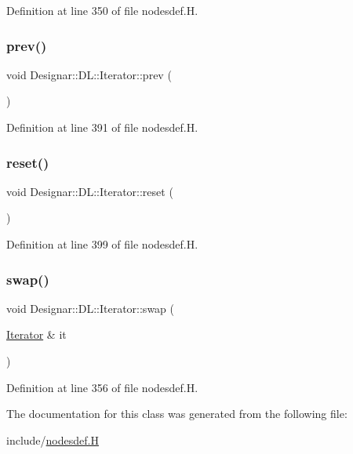 Definition at line 350 of file nodesdef.\+H.

\mbox{\label{class_designar_1_1_d_l_1_1_iterator_a8550a08d7c7645c8ec41ba209ee21893}} 
\subsubsection{\texorpdfstring{prev()}{prev()}}
{\footnotesize\ttfamily void Designar\+::\+D\+L\+::\+Iterator\+::prev (\begin{DoxyParamCaption}{ }\end{DoxyParamCaption})\hspace{0.3cm}{\ttfamily [inline]}}



Definition at line 391 of file nodesdef.\+H.

\mbox{\label{class_designar_1_1_d_l_1_1_iterator_a7708230beaa8a47d664878d37c11bbd3}} 
\subsubsection{\texorpdfstring{reset()}{reset()}}
{\footnotesize\ttfamily void Designar\+::\+D\+L\+::\+Iterator\+::reset (\begin{DoxyParamCaption}{ }\end{DoxyParamCaption})\hspace{0.3cm}{\ttfamily [inline]}}



Definition at line 399 of file nodesdef.\+H.

\mbox{\label{class_designar_1_1_d_l_1_1_iterator_af8bba1d661f8d6300664481d7c6fd976}} 
\subsubsection{\texorpdfstring{swap()}{swap()}}
{\footnotesize\ttfamily void Designar\+::\+D\+L\+::\+Iterator\+::swap (\begin{DoxyParamCaption}\item[{\hyperlink{class_designar_1_1_d_l_1_1_iterator}{Iterator} \&}]{it }\end{DoxyParamCaption})\hspace{0.3cm}{\ttfamily [inline]}}



Definition at line 356 of file nodesdef.\+H.



The documentation for this class was generated from the following file\+:\begin{DoxyCompactItemize}
\item 
include/\hyperlink{nodesdef_8_h}{nodesdef.\+H}\end{DoxyCompactItemize}
